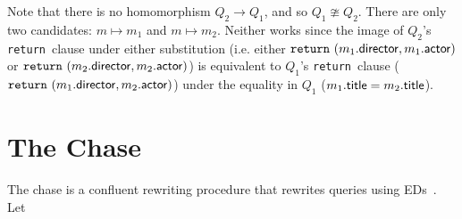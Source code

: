 \documentclass{sigplanconf}
\newcommand{\RETURN}{{\tt return}\relax\ifmmode\ \else\xspace\fi}
\begin{document}
Note that there is no homomorphism $Q_2 \to Q_1$, and so $Q_1 \ncong Q_2$.  
There are only two candidates: $m \mapsto m_1$ and $m \mapsto m_2$.  
Neither works since the image of $Q_2$'s \RETURN clause under either substitution (i.e. either $\RETURN (m_1.{\sf director}, m_1.{\sf actor})$ or $\RETURN (m_2.{\sf director}, m_2.{\sf actor})$) is equivalent to $Q_1$'s \RETURN clause ($\RETURN (m_1.{\sf director}, m_2.{\sf actor})$) under the equality in $Q_1$ ($m_1.{\sf title} = m_2.{\sf title}$).

%
%


\section{The Chase}
\label{sec:chase}

The chase is a confluent rewriting procedure that rewrites queries using EDs~\cite{foundations}.   Let
\end{document}
